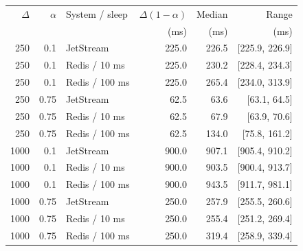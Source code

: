 \begin{tabular}{rrlrrr}
\toprule
$\Delta$ & $\alpha$ & System / sleep & $\Delta(1-\alpha)$ & Median & Range\\
 & & & (ms) & (ms) & (ms)\\
\midrule
250 & 0.1 & JetStream & 225.0 & 226.5 & [225.9, 226.9]\\
250 & 0.1 & Redis / 10 ms & 225.0 & 230.2 & [228.4, 234.3]\\
250 & 0.1 & Redis / 100 ms & 225.0 & 265.4 & [234.0, 313.9]\\
250 & 0.75 & JetStream & 62.5 & 63.6 & [63.1, 64.5]\\
250 & 0.75 & Redis / 10 ms & 62.5 & 67.9 & [63.9, 70.6]\\
250 & 0.75 & Redis / 100 ms & 62.5 & 134.0 & [75.8, 161.2]\\
1000 & 0.1 & JetStream & 900.0 & 907.1 & [905.4, 910.2]\\
1000 & 0.1 & Redis / 10 ms & 900.0 & 903.5 & [900.4, 913.7]\\
1000 & 0.1 & Redis / 100 ms & 900.0 & 943.5 & [911.7, 981.1]\\
1000 & 0.75 & JetStream & 250.0 & 257.9 & [255.5, 260.6]\\
1000 & 0.75 & Redis / 10 ms & 250.0 & 255.4 & [251.2, 269.4]\\
1000 & 0.75 & Redis / 100 ms & 250.0 & 319.4 & [258.9, 339.4]\\
\bottomrule
\end{tabular}
